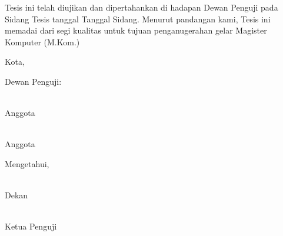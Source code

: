 
\noindent
\hspace{0.5cm} Tesis ini telah diujikan dan dipertahankan di hadapan Dewan Penguji pada Sidang Tesis tanggal {Tanggal Sidang}. Menurut pandangan kami, Tesis ini memadai dari segi kualitas untuk tujuan penganugerahan gelar Magister Komputer (M.Kom.)

\vspace{0.8cm}


\begin{center}
{Kota}, \makebox[4cm]{\dotfill}  %

\vspace{0.5cm}

Dewan Penguji:
\end{center}

\vspace{1.5cm}

\noindent
\begin{minipage}[t]{0.49\textwidth}
\centering
{\small \underline{\ExaminerOne}}\\
{\small Anggota}
\end{minipage}%
\hfill
\begin{minipage}[t]{0.49\textwidth}
\centering
{\small \underline{\ExaminerTwo}}\\
{\small Anggota}
\end{minipage}

\vspace{3em}

\begin{center}
{\small Mengetahui,}
\end{center}

\vspace{3em}

\noindent
\begin{minipage}[t]{0.49\textwidth}
\centering
{\small \underline{\DeanName}}\\
{\small Dekan}
\end{minipage}%
\hfill
\begin{minipage}[t]{0.49\textwidth}
\centering
{\small \underline{\ChairExaminer}}\\
{\small Ketua Penguji}
\end{minipage}

